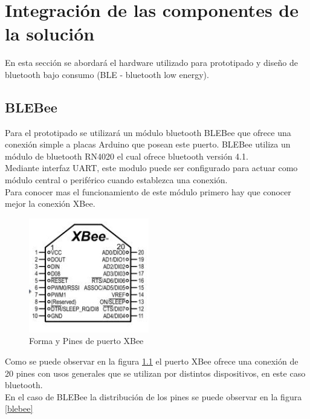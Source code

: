 \chapter{Integración de las componentes de la solución}\label{mldp}
En esta sección se abordará el hardware utilizado para prototipado y diseño de bluetooth bajo consumo (BLE - bluetooth low energy). 

\section{BLEBee}
Para el prototipado se utilizará un módulo bluetooth BLEBee que ofrece una conexión simple a placas Arduino que posean este puerto. 
BLEBee utiliza un módulo de bluetooth RN4020 el cual ofrece bluetooth versión 4.1.\\
Mediante interfaz UART, este modulo puede ser configurado para actuar como módulo central o periférico cuando establezca una conexión.\\
Para conocer mas el funcionamiento de este módulo primero hay que conocer mejor la conexión XBee.

\begin{figure}[H]
\centering
\includegraphics[scale=1]{figuras/bluetooth/xbee.png}
\caption{Forma y Pines de puerto XBee}
\label{xbee}
\end{figure}

Como se puede observar en la figura \ref{xbee} el puerto XBee ofrece una conexión de 20 pines con usos generales que se utilizan por distintos dispositivos, en este caso bluetooth.\\
En el caso de BLEBee la distribución de los pines se puede observar en la figura \ref{blebee}

